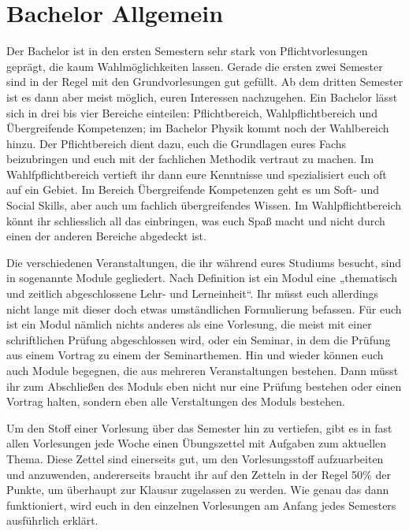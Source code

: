 \section{Bachelor Allgemein}
Der Bachelor ist in den ersten Semestern sehr stark von Pflichtvorlesungen
geprägt, die kaum Wahlmöglichkeiten lassen. Gerade die ersten zwei Semester
sind in der Regel mit den Grundvorlesungen gut gefüllt. Ab dem dritten Semester
ist es dann aber meist möglich, euren Interessen nachzugehen.
Ein Bachelor lässt sich in drei bis vier Bereiche einteilen: Pflichtbereich,
Wahlpflichtbereich und Übergreifende Kompetenzen; im Bachelor Physik kommt noch
der Wahlbereich hinzu.
Der Pflichtbereich dient dazu, euch die Grundlagen eures Fachs beizubringen und
euch mit der fachlichen Methodik vertraut zu machen.  Im Wahlfpflichtbereich
vertieft ihr dann eure Kenntnisse und spezialisiert euch oft auf ein Gebiet. Im
Bereich Übergreifende Kompetenzen geht es um Soft- und Social Skills, aber auch
um fachlich übergreifendes Wissen.  Im Wahlpflichtbereich könnt ihr
schliesslich all das einbringen, was euch Spaß macht und nicht durch einen der
anderen Bereiche abgedeckt ist.

Die verschiedenen Veranstaltungen, die ihr während eures Studiums besucht, sind
in sogenannte Module gegliedert. Nach Definition ist ein Modul eine „thematisch
und zeitlich abgeschlossene Lehr- und Lerneinheit“. Ihr müsst euch allerdings
nicht lange mit dieser doch etwas umständlichen Formulierung befassen. Für euch
ist ein Modul nämlich nichts anderes als eine Vorlesung, die meist mit einer
schriftlichen Prüfung abgeschlossen wird, oder ein Seminar, in dem die Prüfung
aus einem Vortrag zu einem der Seminarthemen. Hin und wieder können euch auch
Module begegnen, die aus mehreren Veranstaltungen bestehen. Dann müsst ihr zum
Abschließen des Moduls eben nicht nur eine Prüfung bestehen oder einen Vortrag
halten, sondern eben alle Verstaltungen des Moduls bestehen.

Um den Stoff einer Vorlesung über das Semester hin zu vertiefen, gibt es in
fast allen Vorlesungen jede Woche einen Übungszettel mit Aufgaben zum aktuellen
Thema. Diese Zettel sind einerseits gut, um den Vorlesungsstoff aufzuarbeiten
und anzuwenden, andererseits braucht ihr auf den Zetteln in der Regel 50\% der
Punkte, um überhaupt zur Klausur zugelassen zu werden. Wie genau das dann
funktioniert, wird euch in den einzelnen Vorlesungen am Anfang jedes Semesters
ausführlich erklärt.

